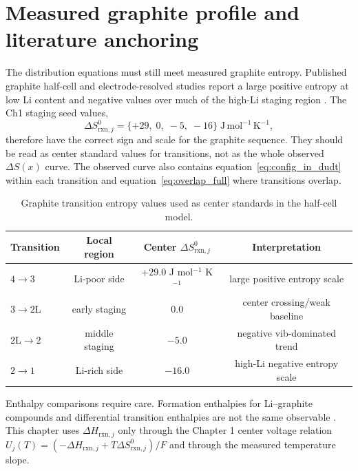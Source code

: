 \documentclass[11pt,a4paper]{article}
\newcommand{\rxn}{\mathrm{rxn}}
\begin{document}
\section{Measured graphite profile and literature anchoring}
\label{sec:profile}
The distribution equations must still meet measured graphite entropy. Published graphite
half-cell and electrode-resolved studies report a large positive entropy at low Li content
and negative values over much of the high-Li staging region \cite{reynier2003,allart2018}.
The Ch1 staging seed values,
\[
\Delta S^0_{\rxn,j}=\{+29,\;0,\;-5,\;-16\}\;
\mathrm{J\,mol^{-1}\,K^{-1}},
\]
therefore have the correct sign and scale for the graphite sequence. They should be read
as center standard values for transitions, not as the whole observed $\Delta S(x)$ curve.
The observed curve also contains equation~\eqref{eq:config_in_dudt} within each transition
and equation~\eqref{eq:overlap_full} where transitions overlap.

\begin{table}[t]
\centering\small
\renewcommand{\arraystretch}{1.15}
\caption{Graphite transition entropy values used as center standards in the half-cell model.}
\label{tab:ds}
\begin{tabular}{l c c c}
\toprule
Transition & Local region & Center $\Delta S^0_{\rxn,j}$ & Interpretation\\
\midrule
$4\to3$ & Li-poor side & $+29.0$ J mol$^{-1}$ K$^{-1}$ & large positive entropy scale\\
$3\to2\mathrm L$ & early staging & $0.0$ & center crossing/weak baseline\\
$2\mathrm L\to2$ & middle staging & $-5.0$ & negative vib-dominated trend\\
$2\to1$ & Li-rich side & $-16.0$ & high-Li negative entropy scale\\
\bottomrule
\end{tabular}
\end{table}

Enthalpy comparisons require care. Formation enthalpies for Li--graphite compounds and
differential transition enthalpies are not the same observable \cite{chemmater2015}.
This chapter uses $\Delta H_{\rxn,j}$ only through the Chapter 1 center voltage relation
$U_j(T)=(-\Delta H_{\rxn,j}+T\Delta S^0_{\rxn,j})/F$ and through the measured
temperature slope.

\end{document}
